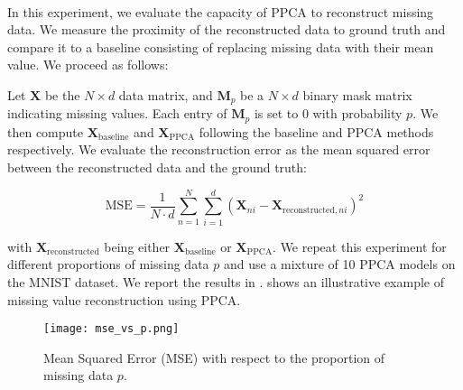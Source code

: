 \documentclass{article}
\begin{document}
\paragraph{} In this experiment, we evaluate the capacity of PPCA to reconstruct missing data. We measure the proximity of the reconstructed data to ground truth and compare it to %
a baseline consisting of replacing missing data with their mean value. We proceed as follows:




Let $\mathbf{X}$ be the $N \times d$ data matrix, and $\mathbf{M}_p$ be a $N \times d$ binary mask matrix indicating missing values. Each entry of $\mathbf{M}_p$ is set to $0$ with probability $p$. We then compute $\mathbf{X}_{\text{baseline}}$ and $\mathbf{X}_{\text{PPCA}}$ following the baseline and PPCA methods respectively. We evaluate the reconstruction error as the mean squared error between the reconstructed data and the ground truth:

\begin{equation}
    \label{eq:missing_data_error}
    \text{MSE} = \frac{1}{N \cdot d} \sum_{n=1}^N \sum_{i=1}^d \left(\mathbf{X}_{ni} - \mathbf{X}_{\text{reconstructed},ni}\right)^2
\end{equation}

with $\mathbf{X}_{\text{reconstructed}}$ being either $\mathbf{X}_{\text{baseline}}$ or $\mathbf{X}_{\text{PPCA}}$. We repeat this experiment for different proportions of missing data $p$ and use a mixture of 10 PPCA models on the MNIST dataset. We report the results in .  shows an illustrative example of missing value reconstruction using PPCA.

\begin{figure}[h]
    \centering
    \texttt{[image: mse\_vs\_p.png]}
    \caption{Mean Squared Error (MSE) with respect to the proportion of missing data $p$.}
    \label{fig:mse_vs_p}
\end{figure}
\end{document}
